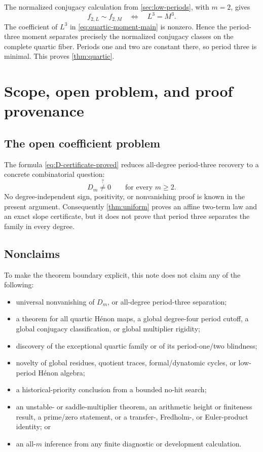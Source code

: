 \documentclass[11pt]{article}
\theoremstyle{definition}
\theoremstyle{remark}
\begin{document}
The normalized conjugacy calculation from \cref{sec:low-periods}, with
\(m=2\), gives
\[
f_{2,L}\sim f_{2,M}
\quad\Longleftrightarrow\quad
L^3=M^3.
\]
The coefficient of \(L^3\) in \eqref{eq:quartic-moment-main} is nonzero.
Hence the period-three moment separates precisely the normalized conjugacy
classes on the complete quartic fiber.  Periods one and two are constant
there, so period three is minimal.  This proves \cref{thm:quartic}.

\section{Scope, open problem, and proof provenance}
\label{sec:scope}

\subsection{The open coefficient problem}

The formula \eqref{eq:D-certificate-proved} reduces all-degree period-three
recovery to a concrete combinatorial question:
\begin{equation}
D_m\stackrel{?}{\ne}0
\qquad\text{for every }m\ge2.
\label{eq:open-nonvanishing}
\end{equation}
No degree-independent sign, positivity, or nonvanishing proof is known in the
present argument.  Consequently \cref{thm:uniform} proves an affine
two-term law and an exact slope certificate, but it does not prove that
period three separates the family in every degree.

\subsection{Nonclaims}

To make the theorem boundary explicit, this note does not claim any of the
following:
\begin{itemize}[leftmargin=2em]
  \item universal nonvanishing of \(D_m\), or all-degree period-three
  separation;
  \item a theorem for all quartic H\'enon maps, a global degree-four period
  cutoff, a global conjugacy classification, or global multiplier rigidity;
  \item discovery of the exceptional quartic family or of its period-one/two
  blindness;
  \item novelty of global residues, quotient traces, formal/dynatomic cycles,
  or low-period H\'enon algebra;
  \item a historical-priority conclusion from a bounded no-hit search;
  \item an unstable- or saddle-multiplier theorem, an arithmetic height or
  finiteness result, a prime/zero statement, or a transfer-, Fredholm-, or
  Euler-product identity; or
  \item an all-\(m\) inference from any finite diagnostic or development
  calculation.
\end{itemize}
\end{document}

